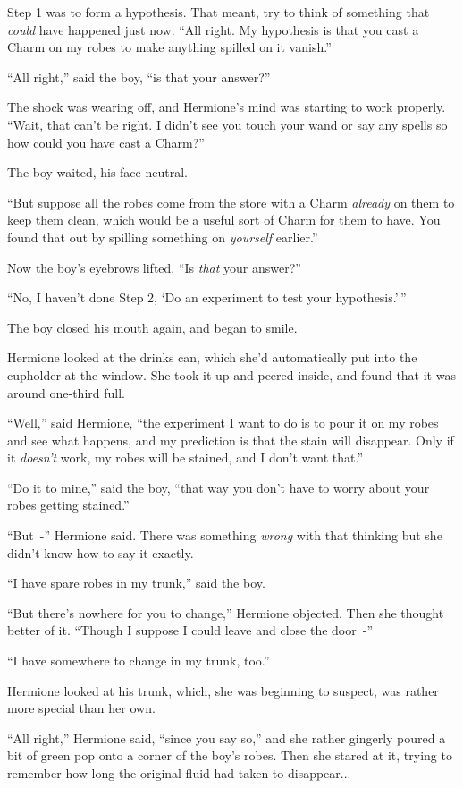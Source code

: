 Step 1 was to form a hypothesis. That meant, try to think of something that \emph{could} have happened just now. ``All right. My hypothesis is that you cast a Charm on my robes to make anything spilled on it vanish.''

``All right,'' said the boy, ``is that your answer?''

The shock was wearing off, and Hermione's mind was starting to work properly. ``Wait, that can't be right. I didn't see you touch your wand or say any spells so how could you have cast a Charm?''

The boy waited, his face neutral.

``But suppose all the robes come from the store with a Charm \emph{already} on them to keep them clean, which would be a useful sort of Charm for them to have. You found that out by spilling something on \emph{yourself} earlier.''

Now the boy's eyebrows lifted. ``Is \emph{that} your answer?''

``No, I haven't done Step 2, `Do an experiment to test your hypothesis.'\,''

The boy closed his mouth again, and began to smile.

Hermione looked at the drinks can, which she'd automatically put into the cupholder at the window. She took it up and peered inside, and found that it was around one-third full.

``Well,'' said Hermione, ``the experiment I want to do is to pour it on my robes and see what happens, and my prediction is that the stain will disappear. Only if it \emph{doesn't} work, my robes will be stained, and I don't want that.''

``Do it to mine,'' said the boy, ``that way you don't have to worry about your robes getting stained.''

``But~-'' Hermione said. There was something \emph{wrong} with that thinking but she didn't know how to say it exactly.

``I have spare robes in my trunk,'' said the boy.

``But there's nowhere for you to change,'' Hermione objected. Then she thought better of it. ``Though I suppose I could leave and close the door~-''

``I have somewhere to change in my trunk, too.''

Hermione looked at his trunk, which, she was beginning to suspect, was rather more special than her own.

``All right,'' Hermione said, ``since you say so,'' and she rather gingerly poured a bit of green pop onto a corner of the boy's robes. Then she stared at it, trying to remember how long the original fluid had taken to disappear...

